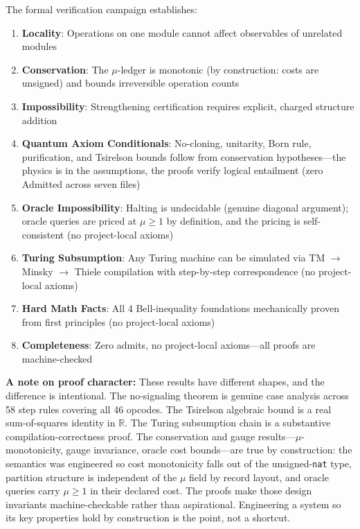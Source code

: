 The formal verification campaign establishes:
\begin{enumerate}
    \item \textbf{Locality}: Operations on one module cannot affect observables of unrelated modules
    \item \textbf{Conservation}: The $\mu$-ledger is monotonic (by construction: costs are unsigned) and bounds irreversible operation counts
    \item \textbf{Impossibility}: Strengthening certification requires explicit, charged structure addition
    \item \textbf{Quantum Axiom Conditionals}: No-cloning, unitarity, Born rule, purification, and Tsirelson bounds follow from conservation hypotheses---the physics is in the assumptions, the proofs verify logical entailment (zero Admitted across seven files)
    \item \textbf{Oracle Impossibility}: Halting is undecidable (genuine diagonal argument); oracle queries are priced at $\mu \geq 1$ by definition, and the pricing is self-consistent (no project-local axioms)
    \item \textbf{Turing Subsumption}: Any Turing machine can be simulated via TM $\to$ Minsky $\to$ Thiele compilation with step-by-step correspondence (no project-local axioms)
    \item \textbf{Hard Math Facts}: All 4 Bell-inequality foundations mechanically proven from first principles (no project-local axioms)
    \item \textbf{Completeness}: Zero admits, no project-local axioms---all proofs are machine-checked
\end{enumerate}

\textbf{A note on proof character:} These results have different shapes, and the difference is intentional. The no-signaling theorem is genuine case analysis across 58 step rules covering all 46 opcodes. The Tsirelson algebraic bound is a real sum-of-squares identity in $\mathbb{R}$. The Turing subsumption chain is a substantive compilation-correctness proof. The conservation and gauge results---$\mu$-monotonicity, gauge invariance, oracle cost bounds---are true by construction: the semantics was engineered so cost monotonicity falls out of the unsigned-\texttt{nat} type, partition structure is independent of the $\mu$ field by record layout, and oracle queries carry $\mu \ge 1$ in their declared cost. The proofs make those design invariants machine-checkable rather than aspirational. Engineering a system so its key properties hold by construction is the point, not a shortcut.
